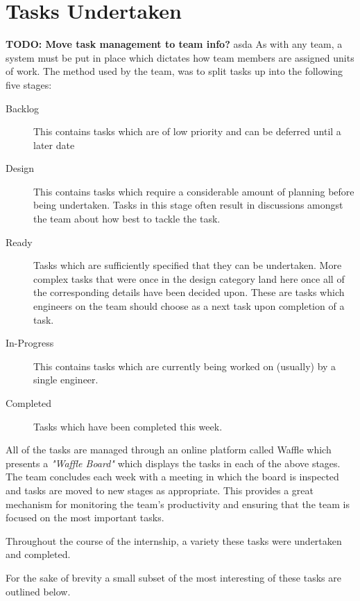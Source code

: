\section{Tasks Undertaken}
\textbf{TODO: Move task management to team info?}
asda
As with any team, a system must be put in place which dictates how team members are assigned units of work. The method used by the \team{} team, was to split tasks up into the following five stages:
\begin{description}
	\item [Backlog] This contains tasks which are of low priority and can be deferred until a later date
	\item [Design] This contains tasks which require a considerable amount of planning before being undertaken. Tasks in this stage often result in discussions amongst the team about how best to tackle the task.
	\item [Ready] Tasks which are sufficiently specified that they can be undertaken. More complex tasks that were once in the design category land here once all of the corresponding details have been decided upon. These are tasks which engineers on the team should choose as a next task upon completion of a task.
	\item [In-Progress] This contains tasks which are currently being worked on (usually) by a single engineer.
	\item [Completed] Tasks which have been completed this week.
\end{description}

All of the tasks are managed through an online platform called Waffle\cite{waffle} which presents a \textit{"Waffle Board"} which displays the tasks in each of the above stages. The team concludes each week with a meeting in which the board is inspected and tasks are moved to new stages as appropriate. This provides a great mechanism for monitoring the team's productivity and ensuring that the team is focused on the most important tasks. 

Throughout the course of the internship, a variety these tasks were undertaken and completed.  

For the sake of brevity a small subset of the most interesting of these tasks are outlined below. 